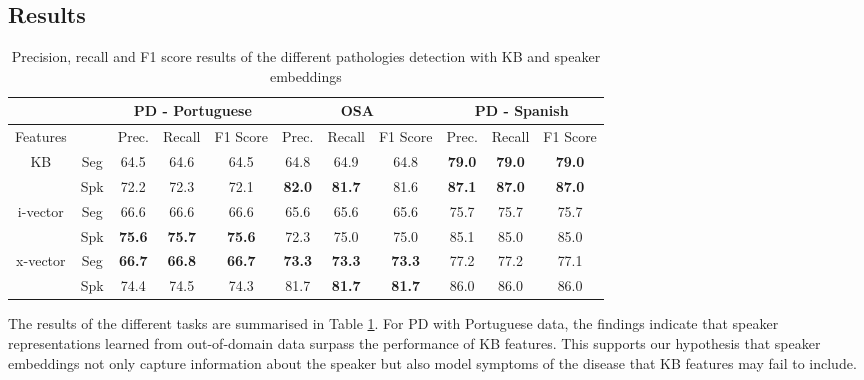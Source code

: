 \subsection{Results}
\begin{table}[h]
  \begin{tabular}{cc|ccc|ccc|ccc} \hline
                            &     & \multicolumn{3}{c|}{PD - Portuguese} & \multicolumn{3}{c|}{OSA}                      & \multicolumn{3}{c}{PD - Spanish} \\ \hline
  Features                  &     & Prec.        & Recall           & F1 Score        & Prec.     & Recall        & F1 Score      & Prec.       & Recall         & F1 Score       \\ \hline
  \multirow{2}{*}{KB}       & Seg & 64.5             & 64.6             & 64.5            & 64.8          & 64.9          & 64.8          & \textbf{79.0}   & \textbf{79.0}  & \textbf{79.0}  \\
                            & Spk & 72.2             & 72.3             & 72.1            & \textbf{82.0} & \textbf{81.7} & 81.6          & \textbf{87.1}   & \textbf{87.0}  & \textbf{87.0}  \\ \hline
  \multirow{2}{*}{i-vector} & Seg & 66.6             & 66.6             & 66.6            & 65.6          & 65.6          & 65.6          & 75.7            & 75.7           & 75.7           \\
                            & Spk & \textbf{75.6}    & \textbf{75.7}    & \textbf{75.6}   & 72.3          & 75.0          & 75.0          & 85.1            & 85.0           & 85.0           \\ \hline
  \multirow{2}{*}{x-vector} & Seg & \textbf{66.7}    & \textbf{66.8}    & \textbf{66.7}   & \textbf{73.3} & \textbf{73.3} & \textbf{73.3} & 77.2            & 77.2           & 77.1           \\
                            & Spk & 74.4             & 74.5             & 74.3            & 81.7          & \textbf{81.7} & \textbf{81.7} & 86.0            & 86.0           & 86.0 \\ \hline    
  \end{tabular}
  \caption{Precision, recall and F1 score results of the different pathologies detection with KB and speaker embeddings}
  \label{tab:xvect_results}
  \end{table}
The results of the different tasks are summarised in Table \ref{tab:xvect_results}. For \ac{PD} with Portuguese data, the findings indicate that speaker representations learned from out-of-domain data surpass the performance of \ac{KB} features. This supports our hypothesis that speaker embeddings not only capture information about the speaker but also model symptoms of the disease that \ac{KB} features may fail to include.

